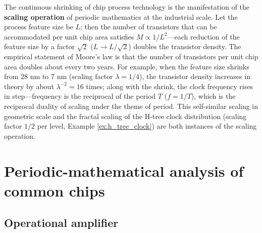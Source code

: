 \begin{definition}\label{ch24_moore_scaling}
The continuous shrinking of chip process technology is the manifestation of the \textbf{scaling operation} of periodic mathematics at the industrial scale. Let the process feature size be $L$; then the number of transistors that can be accommodated per unit chip area satisfies $M \propto 1/L^2$---each reduction of the feature size by a factor $\sqrt{2}$ ($L \to L/\sqrt{2}$) doubles the transistor density. The empirical statement of Moore's law is that the number of transistors per unit chip area doubles about every two years. For example, when the feature size shrinks from $28$ nm to $7$ nm (scaling factor $\lambda = 1/4$), the transistor density increases in theory by about $\lambda^{-2} = 16$ times; along with the shrink, the clock frequency rises in step---frequency is the reciprocal of the period $T$ ($f = 1/T$), which is the reciprocal duality of scaling under the theme of period. This self-similar scaling in geometric scale and the fractal scaling of the H-tree clock distribution (scaling factor $1/2$ per level, Example \ref{ex:h_tree_clock}) are both instances of the scaling operation.
\end{definition}

\section{Periodic-mathematical analysis of common chips}

\subsection{Operational amplifier}

